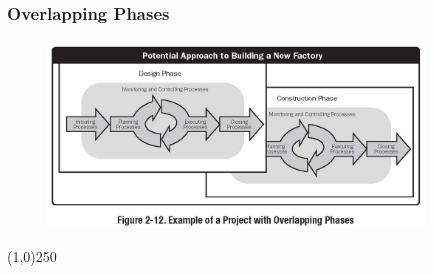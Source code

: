 \begin{frame}
\frametitle{Overlapping Phases}
 \begin{figure}
 	\centering
 		\includegraphics[width = 10cm]{images/Fig2-12.jpg}
 	\label{fig:2-12}
 \end{figure}
\end{frame}
\begin{center}\line(1,0){250}\end{center}


